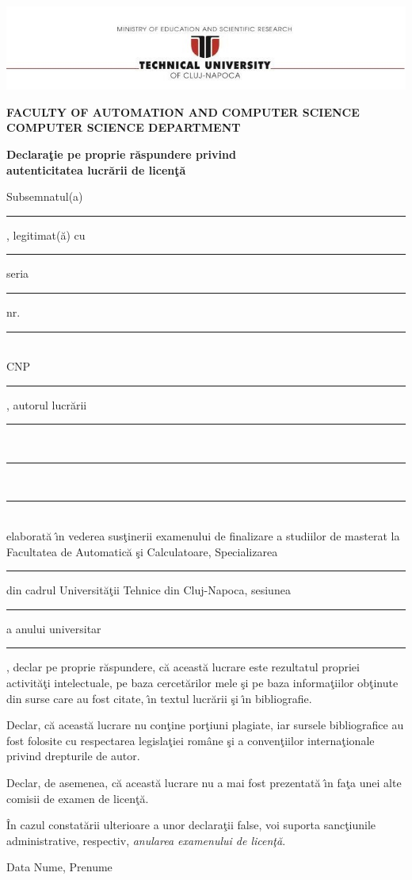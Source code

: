 \documentclass[12pt,a4paper,twoside]{report}
\newcommand{\department}{\bf FACULTY OF AUTOMATION AND COMPUTER SCIENCE\\
COMPUTER SCIENCE DEPARTMENT}
\newcommand{\utcnlogo}{\includegraphics[width=15cm]{img/tucn.jpg}}
\newcommand{\uline}[1]{\rule[0pt]{#1}{0.4pt}}
\begin{document}
\thispagestyle{empty}
\newpage

\begin{center}
\utcnlogo

\department
\end{center}

\begin{center}
{\bf
Declara\c{t}ie pe proprie r\u{a}spundere privind\\ 
autenticitatea lucr\u{a}rii de licen\c{t}\u{a}}
\end{center}
\vspace{0.5cm}



Subsemnatul(a) \\
\uline{14.8cm}, 
legitimat(\u{a}) cu \uline{4cm} seria \uline{3cm} nr. \uline{4cm}\\
CNP \uline{9cm}, autorul lucr\u{a}rii \uline{2.8cm}\\
\uline{16cm}\\
\uline{16cm}\\
elaborat\u{a} \^{\i}n vederea sus\c{t}inerii examenului de finalizare a studiilor de masterat la Facultatea de Automatic\u{a} \c{s}i Calculatoare, Specializarea \uline{7cm} din cadrul Universit\u{a}\c{t}ii Tehnice din Cluj-Napoca, sesiunea \uline{4cm} a anului universitar \uline{3cm}, declar pe proprie r\u{a}spundere, c\u{a} aceast\u{a} lucrare este rezultatul propriei activit\u{a}\c{t}i intelectuale, pe baza cercet\u{a}rilor mele \c{s}i pe baza informa\c{t}iilor ob\c{t}inute din surse care au fost citate, \^{\i}n textul lucr\u{a}rii \c{s}i \^{\i}n bibliografie.

Declar, c\u{a} aceast\u{a} lucrare nu con\c{t}ine por\c{t}iuni plagiate, iar sursele bibliografice au fost folosite cu 
respectarea legisla\c{t}iei rom\^{a}ne \c{s}i a conven\c{t}iilor interna\c{t}ionale privind drepturile de autor.

Declar, de asemenea, c\u{a} aceast\u{a} lucrare nu a mai fost prezentat\u{a} \^{\i}n fa\c{t}a unei alte comisii de examen de licen\c{t}\u{a}.

\^{I}n cazul constat\u{a}rii ulterioare a unor declara\c{t}ii false, voi suporta sanc\c{t}iunile administrative, respectiv, \emph{anularea examenului de licen\c{t}\u{a}}.

\vspace{1.5cm}

Data \hspace{8cm} Nume, Prenume

\vspace{0.5cm}
\end{document}
